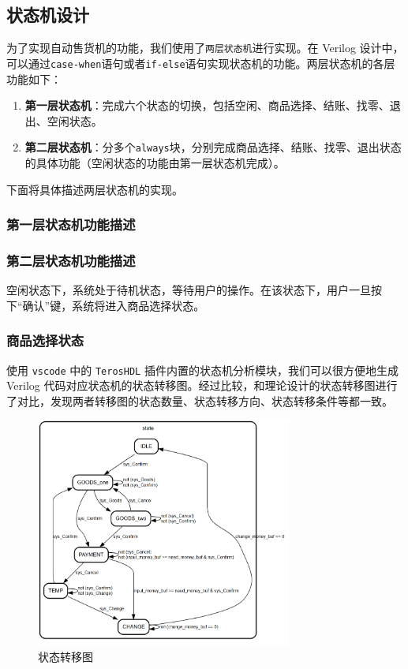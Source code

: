 \documentclass[12pt]{SEU-Circuit-Report}
\begin{document}
    \subsection{状态机设计}
    为了实现自动售货机的功能，我们使用了\texttt{两层状态机}进行实现。在 Verilog 设计中，可以通过\texttt{case-when}语句或者\texttt{if-else}语句实现状态机的功能。两层状态机的各层功能如下：
    \begin{enumerate}
        \item \textbf{第一层状态机}：完成六个状态的切换，包括空闲、商品选择、结账、找零、退出、空闲状态。
        \item \textbf{第二层状态机}：分多个\texttt{always}块，分别完成商品选择、结账、找零、退出状态的具体功能（空闲状态的功能由第一层状态机完成）。
    \end{enumerate}
    下面将具体描述两层状态机的实现。

    \subsubsection{第一层状态机功能描述}
    
    \subsubsection{第二层状态机功能描述}
    空闲状态下，系统处于待机状态，等待用户的操作。在该状态下，用户一旦按下“确认”键，系统将进入商品选择状态。
    \subsubsection{商品选择状态}
    使用 \texttt{vscode} 中的 \texttt{TerosHDL} 插件内置的状态机分析模块，我们可以很方便地生成 Verilog 代码对应状态机的状态转移图。经过比较，和理论设计的状态转移图进行了对比，发现两者转移图的状态数量、状态转移方向、状态转移条件等都一致。
    \begin{figure}[htbp]
        \centering
        \includegraphics[width=0.75\textwidth]{fig/generatedFlowchart.png}
        \caption{状态转移图}
    \end{figure}
\end{document}
